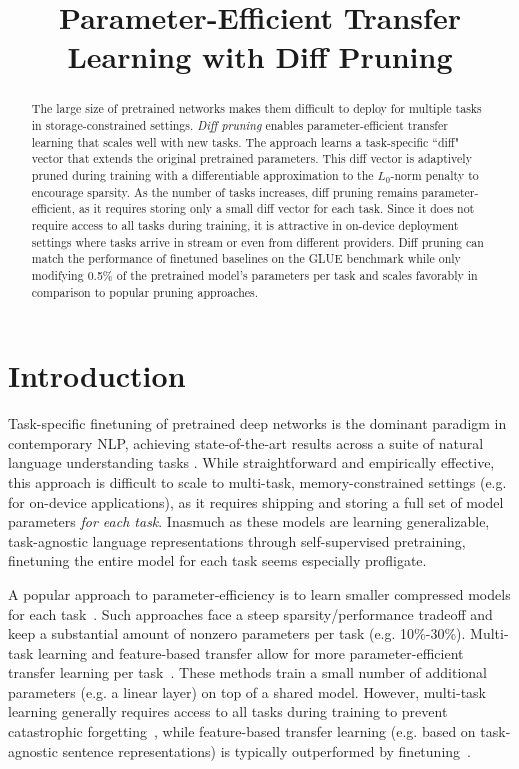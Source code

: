 \title{Parameter-Efficient Transfer Learning with Diff Pruning}

\begin{abstract}
The large size of pretrained networks makes them difficult to deploy for multiple tasks in storage-constrained settings.
\emph{Diff pruning} enables parameter-efficient transfer learning that scales well with new tasks. The approach learns a task-specific ``diff" vector that extends the original pretrained parameters. This diff vector is adaptively pruned during training with a differentiable approximation to the $L_0$-norm penalty to encourage sparsity. As the number of tasks increases, diff pruning remains parameter-efficient, as it requires storing only a small diff vector for each task. Since it does not require access to all tasks during training, it is attractive in on-device deployment settings where tasks arrive in stream or even from different providers. Diff pruning can match the performance of finetuned baselines on the GLUE benchmark while only modifying 0.5$\%$ of the pretrained model's parameters per task and scales favorably in comparison to popular pruning approaches.

\end{abstract}

\section{Introduction}

Task-specific finetuning of pretrained deep networks is the dominant paradigm in contemporary NLP, achieving state-of-the-art results across a suite of natural language understanding tasks \citep{devlin2018bert,liu2019roberta,yang2019xlnet,lan2020albert}. While straightforward and empirically effective, this approach is difficult to scale to multi-task, memory-constrained settings (e.g. for on-device applications), as it requires shipping and storing a full set of model parameters \textit{for each task}. Inasmuch as these models are learning generalizable, task-agnostic language representations through self-supervised pretraining, finetuning the entire model for each task seems especially profligate.

 A popular approach to parameter-efficiency is to learn smaller compressed models for each task~\citep{gordon2020compress,sajjad2020poor,zhao2020masking,sanh2020pruning}. Such approaches face a steep sparsity/performance tradeoff and keep a substantial amount of nonzero parameters per task (e.g. 10\%-30\%). Multi-task learning and feature-based transfer allow for more parameter-efficient transfer learning per task~\citep{liu2019multi,clark2019bam,stickland2019pal,reimers2019sbert}. These methods train a small number of additional parameters (e.g. a linear layer) on top of a shared model. However, multi-task learning generally requires access to all tasks during training to prevent catastrophic forgetting~\citep{french1999forgetting}, while feature-based transfer learning (e.g. based on task-agnostic sentence representations) is typically outperformed by finetuning~\citep{howard2018universal}.

